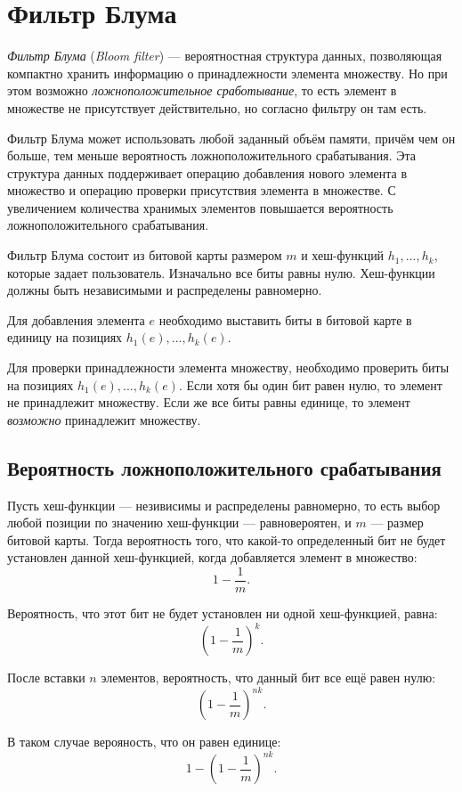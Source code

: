\section{Фильтр Блума}
\label{sec:bloom-filter}
\emph{Фильтр Блума} (\emph{Bloom filter}) — вероятностная структура данных, позволяющая компактно хранить информацию о принадлежности элемента множеству. Но при этом возможно \emph{ложноположительное сработывание}, то есть элемент в множестве не присутствует действительно, но согласно фильтру он там есть.

Фильтр Блума может использовать любой заданный объём памяти, причём чем он больше, тем меньше вероятность ложноположительного срабатывания. Эта структура данных поддерживает операцию добавления нового элемента в множество и операцию проверки присутствия элемента в множестве. С увеличением количества хранимых элементов повышается вероятность ложноположительного срабатывания.

Фильтр Блума состоит из битовой карты размером $m$ и хеш-функций $h_1,...,h_k$, которые задает пользователь. Изначально все биты равны нулю. Хеш-функции должны быть независимыми и распределены равномерно.

Для добавления элемента $e$ необходимо выставить биты в битовой карте в единицу на позициях $h_1(e),...,h_k(e)$.

Для проверки принадлежности элемента множеству, необходимо проверить биты на позициях $h_1(e),...,h_k(e)$. Если хотя бы один бит равен нулю, то элемент не принадлежит множеству. Если же все биты равны единице, то элемент \emph{возможно} принадлежит множеству.

\subsection{Вероятность ложноположительного срабатывания}
Пусть хеш-функции — незивисимы и распределены равномерно, то есть выбор любой позиции по значению хеш-функции — равновероятен, и $m$ — размер битовой карты. Тогда вероятность того, что какой-то определенный бит не будет установлен данной хеш-функцией, когда добавляется элемент в множество:
\[
1 - \frac{1}{m}.
\]

Вероятность, что этот бит не будет установлен ни одной хеш-функцией, равна:
\[
\left( 1 - \frac{1}{m} \right)^k.
\]

После вставки $n$ элементов, вероятность, что данный бит все ещё равен нулю:
\[
\left( 1 - \frac{1}{m} \right)^{nk}.
\]

В таком случае верояность, что он равен единице:
\[
1 - \left( 1 - \frac{1}{m} \right)^{nk}.
\]

